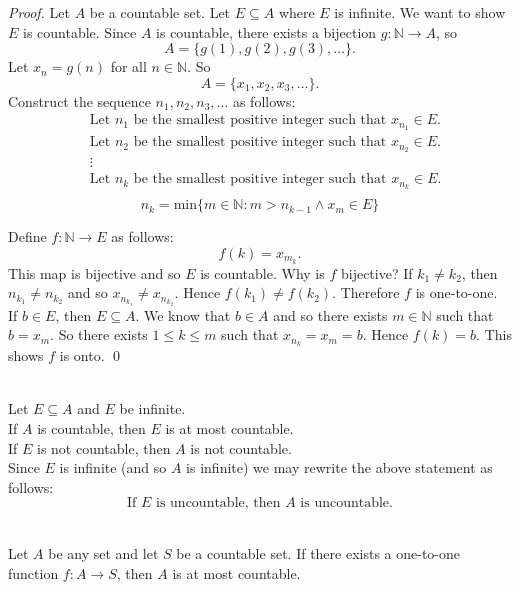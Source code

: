 \begin{proof} \leavevmode
    Let $A$ be a countable set. Let $E \subseteq A$ where $E$ is infinite. We want to show $E$ is countable.
    Since $A$ is countable, there exists a bijection $g:\mathbb{N} \rightarrow A$, so $$A=\{g(1), g(2), g(3),…\}.$$ Let $x_n=g(n)$ for all $n\in \mathbb{N}$. So $$A=\{x_1, x_2, x_3,…\}.$$ Construct the sequence $n_1, n_2, n_3, …$ as follows:
    \begin{align*}
        &\text{Let $n_1$ be the smallest positive integer such that $x_{n_1} \in E$.} \\
        &\text{Let $n_2$ be the smallest positive integer such that $x_{n_2}\in E.$} \\
        &\vdots \\
        &\text{Let $n_k$ be the smallest positive integer such that $x_{n_k} \in E$.} \\
    \end{align*}
    $$n_k = \text{min}\{m\in \mathbb{N}: m > n_{k-1} \wedge x_m\in E\}$$

    Define $f:\mathbb{N}\rightarrow E$ as follows:
    $$f(k)=x_{m_k}.$$
    This map is bijective and so $E$ is countable.
    Why is $f$ bijective?
    If $k_1 \not = k_2$, then $n_{k_1} \not = n_{k_2}$ and so $x_{n_{k_1}} \not = x_{n_{k_2}}$. Hence $f(k_1) \not = f(k_2)$. Therefore $f$ is one-to-one. \\
    If $b\in E$, then $E \subseteq A.$ We know that $b\in A$ and so there exists $m\in \mathbb{N}$ such that $b=x_m$. So there exists $1 \leq k \leq m$ such that $x_{n_k} = x_m = b$. Hence $f(k) = b$. This shows $f$ is onto. \qed
\end{proof}

\begin{contrapositive} \leavevmode \\
    Let $E \subseteq A$ and $E$ be infinite.
    \\ If $A$ is countable, then $E$ is at most countable.
    \\ If $E$ is not countable, then $A$ is not countable. \\
    Since $E$ is infinite (and so $A$ is infinite) we may rewrite the above statement as follows:
    $$\text{If } E \text{ is uncountable, then } A \text{ is uncountable.}$$
\end{contrapositive}

\begin{corollary} \leavevmode \\
    \label{corA}
    Let $A$ be any set and let $S$ be a countable set. If there exists a one-to-one function $f:A \rightarrow S$, then $A$ is at most countable.
\end{corollary}

